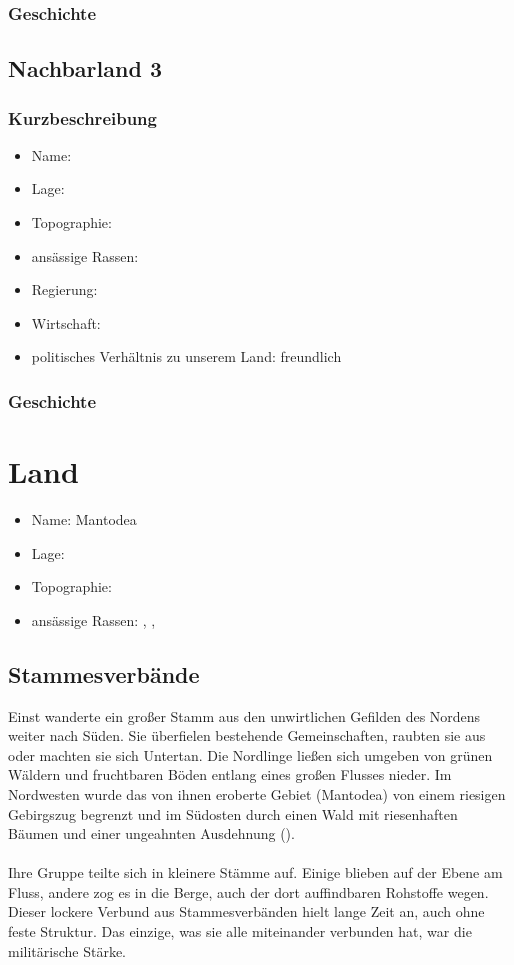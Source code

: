 \subsection{Geschichte}

\section{Nachbarland 3}
\subsection{Kurzbeschreibung}
\begin{itemize}
	\item Name: 
	\item Lage:
	\item Topographie:
	\item ansässige Rassen:
	\item Regierung:
	\item Wirtschaft:
	\item politisches Verhältnis zu unserem Land: freundlich
\end{itemize}

\subsection{Geschichte}

\chapter{Land}
\begin{itemize}
	\item Name: Mantodea
	\item Lage: 
	\item Topographie:
	\item ansässige Rassen: , , 
\end{itemize}
\section{Stammesverbände}
Einst wanderte ein großer Stamm aus den unwirtlichen Gefilden des Nordens weiter nach Süden.
Sie überfielen bestehende Gemeinschaften, raubten sie aus oder machten sie sich Untertan.
Die Nordlinge ließen sich umgeben von grünen Wäldern und fruchtbaren Böden entlang eines großen Flusses nieder.
Im Nordwesten wurde das von ihnen eroberte Gebiet (Mantodea) von einem riesigen Gebirgszug begrenzt und im Südosten durch einen Wald mit riesenhaften Bäumen und einer ungeahnten Ausdehnung ().\\
\\
Ihre Gruppe teilte sich in kleinere Stämme auf.
Einige blieben auf der Ebene am Fluss, andere zog es in die Berge, auch der dort auffindbaren Rohstoffe wegen.
Dieser lockere Verbund aus Stammesverbänden hielt lange Zeit an, auch ohne feste Struktur.
Das einzige, was sie alle miteinander verbunden hat, war die militärische Stärke.

